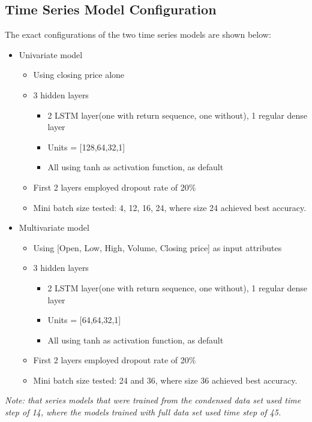 \documentclass{article}
\begin{document}
\subsection{Time Series Model Configuration}
The exact configurations of the two time series models are shown below:
	\begin{itemize}
		\item Univariate model
			\begin{itemize}
				\item Using closing price alone
				\item 3 hidden layers
					\begin{itemize}
						\item  2 LSTM layer(one with return sequence, one without), 1 regular dense layer
						\item Units = [128,64,32,1]
						\item All using tanh as activation function, as default
					\end{itemize}
				\item First 2 layers employed dropout rate of 20\%
				\item Mini batch size tested: 4, 12, 16, 24, where size 24 achieved best accuracy.
			\end{itemize}
		\item Multivariate model
			\begin{itemize}
				\item Using [Open, Low, High, Volume, Closing price] as input attributes
				\item 3 hidden layers
					\begin{itemize}
						\item  2 LSTM layer(one with return sequence, one without), 1 regular dense layer
						\item Units = [64,64,32,1]
						\item All using tanh as activation function, as default
					\end{itemize}
				\item First 2 layers employed dropout rate of 20\%
				\item Mini batch size tested: 24 and 36, where size 36 achieved best accuracy.
			\end{itemize}
	\end{itemize}
\textit{Note: that series models that were trained from the condensed data set used time step of 14, where the models trained with full data set used time step of 45.}
\end{document}
